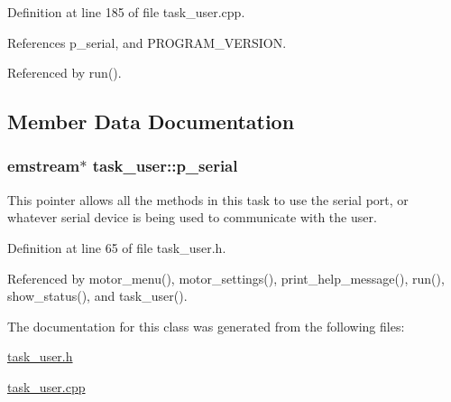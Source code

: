 Definition at line 185 of file task\+\_\+user.\+cpp.



References p\+\_\+serial, and P\+R\+O\+G\+R\+A\+M\+\_\+\+V\+E\+R\+S\+I\+O\+N.



Referenced by run().



\subsection{Member Data Documentation}
\hypertarget{classtask__user_a04ed5c2b4d7c9a1530bde6f217e01681}{
\subsubsection[{p\+\_\+serial}]{\setlength{\rightskip}{0pt plus 5cm}emstream$\ast$ task\+\_\+user\+::p\+\_\+serial\hspace{0.3cm}{\ttfamily [protected]}}}\label{classtask__user_a04ed5c2b4d7c9a1530bde6f217e01681}
This pointer allows all the methods in this task to use the serial port, or whatever serial device is being used to communicate with the user. 

Definition at line 65 of file task\+\_\+user.\+h.



Referenced by motor\+\_\+menu(), motor\+\_\+settings(), print\+\_\+help\+\_\+message(), run(), show\+\_\+status(), and task\+\_\+user().



The documentation for this class was generated from the following files\+:\begin{DoxyCompactItemize}
\item 
\hyperlink{task__user_8h}{task\+\_\+user.\+h}\item 
\hyperlink{task__user_8cpp}{task\+\_\+user.\+cpp}\end{DoxyCompactItemize}
